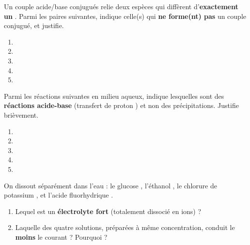 \documentclass[11pt,a4paper]{article}
\begin{document}

\begin{exo}
Un couple acide/base conjugués relie deux espèces qui diffèrent d'\textbf{exactement un} . Parmi les
paires suivantes, indique celle(s) qui \textbf{ne forme(nt) pas} un couple conjugué, et justifie.
\begin{enumerate}[label=\alph*)]
  \item {}
  \item {}
  \item {}
  \item {}
  \item {}
\end{enumerate}
\end{exo}

\begin{exo}
Parmi les réactions suivantes en milieu aqueux, indique lesquelles sont des \textbf{réactions acide-base}
(transfert de proton ) et non des précipitations. Justifie brièvement.
\begin{enumerate}[label=\arabic*)]
  \item {}
  \item {}
  \item {}
  \item {}
  \item {}
\end{enumerate}
\end{exo}

\begin{exo}
On dissout séparément dans l'eau : le glucose , l'éthanol , le chlorure de potassium
, et l'acide fluorhydrique .
\begin{enumerate}[label=\alph*)]
  \item Lequel est un \textbf{électrolyte fort} (totalement dissocié en ions) ?
  \item Laquelle des quatre solutions, préparées à même concentration, conduit le \textbf{moins} le courant ?
        Pourquoi ?
\end{enumerate}
\end{exo}
\end{document}
